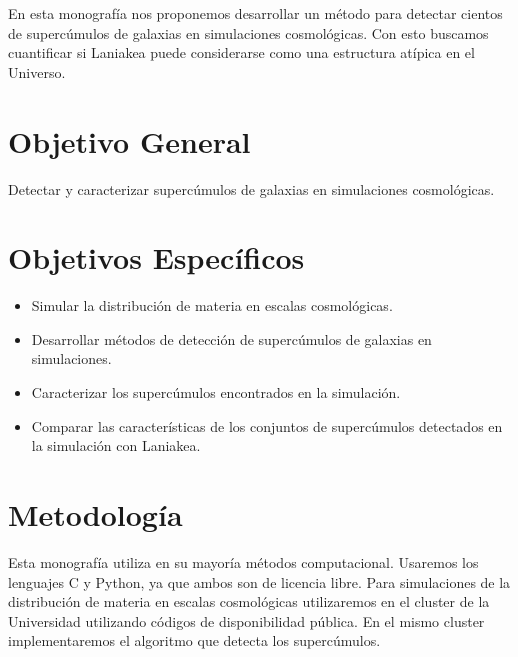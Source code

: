 \documentclass[12pt]{article}
\begin{document}
En esta monograf\'{i}a nos proponemos desarrollar un m\'etodo para
detectar cientos de superc\'{u}mulos de galaxias en simulaciones
cosmol\'ogicas.  
Con esto buscamos cuantificar si Laniakea puede considerarse como una
estructura at\'ipica en el Universo.
\\

\section{Objetivo General}

Detectar y caracterizar superc\'{u}mulos de galaxias en simulaciones
cosmol\'{o}gicas. 
\\

\section{Objetivos Espec\'{i}ficos}

\begin{itemize}
	\item Simular la distribuci\'on de materia en escalas
          cosmol\'{o}gicas. 
	\item Desarrollar m\'{e}todos de detecci\'on de
          superc\'{u}mulos de galaxias en simulaciones.
	\item Caracterizar los superc\'umulos encontrados en la
          simulaci\'on.
        \item Comparar las caracter\'isticas de los conjuntos de
          superc\'umulos detectados en          la simulaci\'on con
          Laniakea. 
\end{itemize}

\section{Metodolog\'{i}a}

Esta monograf\'{i}a utiliza en su mayor\'{i}a m\'etodos computacional.  
Usaremos los lenguajes C y Python, ya que ambos son de licencia
libre. 
Para simulaciones de la distribuci\'on de materia en escalas
cosmol\'ogicas utilizaremos en el cluster de la Universidad utilizando
c\'odigos de disponibilidad p\'ublica.
En el mismo cluster implementaremos el
algoritmo que detecta los superc\'umulos.
\\
\end{document}
